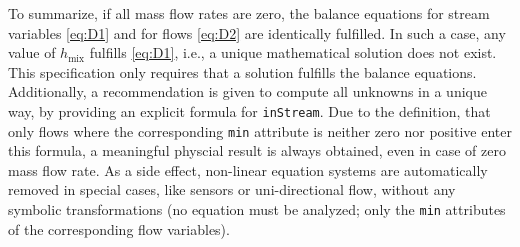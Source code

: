 To summarize, if all mass flow rates are zero, the balance equations for
stream variables \eqref{eq:D1} and for flows \eqref{eq:D2} are identically fulfilled. In
such a case, any value of $h_{\mathrm{mix}}$ fulfills \eqref{eq:D1}, i.e., a unique
mathematical solution does not exist. This specification only requires
that a solution fulfills the balance equations. Additionally, a
recommendation is given to compute all unknowns in a unique way, by
providing an explicit formula for \lstinline!inStream!. Due to the
definition, that only flows where the corresponding \lstinline!min! attribute is
neither zero nor positive enter this formula, a meaningful physcial
result is always obtained, even in case of zero mass flow rate. As a
side effect, non-linear equation systems are automatically removed in
special cases, like sensors or uni-directional flow, without any
symbolic transformations (no equation must be analyzed; only the
\lstinline!min! attributes of the corresponding flow variables).
